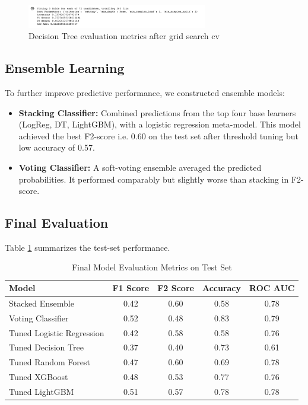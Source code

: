 \documentclass[12pt,a4paper]{article}
\begin{document}
\begin{figure}[H]
    \centering
    \includegraphics[width=0.7\textwidth]{figures/17.png}
    \caption{Decision Tree evaluation metrics after grid search cv}
\end{figure}

\subsection{Ensemble Learning}

To further improve predictive performance, we constructed ensemble models:
\begin{itemize}
    \item \textbf{Stacking Classifier:} Combined predictions from the top four base learners (LogReg, DT,
    LightGBM), with a logistic regression meta-model. This model achieved the best F2-score
    i.e. 0.60 on the test set after threshold tuning but low accuracy of 0.57.
    \item \textbf{Voting Classifier:} A soft-voting ensemble averaged the predicted probabilities. It performed comparably but slightly worse than stacking in F2-score.
\end{itemize}

\subsection{Final Evaluation}

Table \ref{tab:final_eval} summarizes the test-set performance.

\begin{table}[H]
\centering
\caption{Final Model Evaluation Metrics on Test Set}
\label{tab:final_eval}
\begin{tabular}{lcccc}
\toprule
Model & F1 Score & F2 Score & Accuracy & ROC AUC \\
\midrule
Stacked Ensemble & 0.42 & 0.60 & 0.58 & 0.78 \\
Voting Classifier & 0.52 & 0.48 & 0.83 & 0.79 \\
Tuned Logistic Regression & 0.42 & 0.58 & 0.58 & 0.76 \\
Tuned Decision Tree & 0.37 & 0.40 & 0.73 & 0.61 \\
Tuned Random Forest & 0.47 & 0.60 & 0.69 & 0.78 \\
Tuned XGBoost & 0.48 & 0.53 & 0.77 & 0.76 \\
Tuned LightGBM & 0.51 & 0.57 & 0.78 & 0.78 \\
\bottomrule
\end{tabular}
\end{table}
\end{document}
